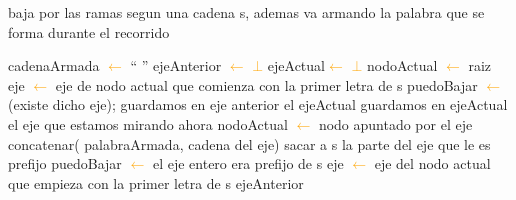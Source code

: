 \begin{algorithm}
\caption{baja por las ramas segun una cadena s, ademas va armando la palabra que se forma durante el recorrido }
\begin{algorithmic}[1]
\STATE cadenaArmada \textcolor{orange}{$\leftarrow$}  `` ''
\STATE ejeAnterior \textcolor{orange}{$\leftarrow$}  \textcolor{orange}{$\bot$}
\STATE ejeActual\textcolor{orange}{$\leftarrow$}  \textcolor{orange}{$\bot$}
\STATE nodoActual \textcolor{orange}{$\leftarrow$} raiz
\STATE eje \textcolor{orange}{$\leftarrow$} eje de nodo actual que comienza con la primer letra de s
\STATE puedoBajar \textcolor{orange}{$\leftarrow$} (existe dicho eje);
	\STATE guardamos en eje anterior el ejeActual
	\STATE guardamos en ejeActual el eje que estamos mirando ahora 
	\STATE nodoActual \textcolor{orange}{$\leftarrow$} nodo apuntado por el eje
	\STATE concatenar( palabraArmada, cadena del eje)
	\STATE sacar a s la parte del eje que le es prefijo
	\STATE puedoBajar \textcolor{orange}{$\leftarrow$} el eje entero era prefijo de s
	\STATE eje \textcolor{orange}{$\leftarrow$} eje del nodo actual que empieza con la primer letra de s
\ENDWHILE
\RETURN ejeAnterior
\label{alg:bajar}
\end{algorithmic}
\end{algorithm}	

